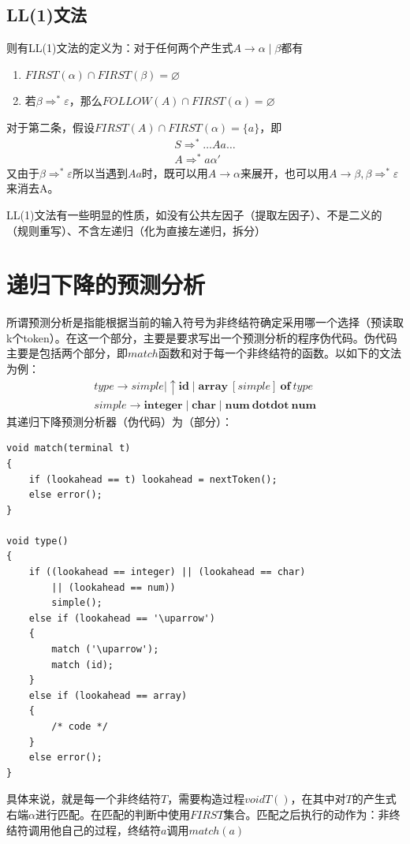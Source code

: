 \documentclass[]{report}
\begin{document}
		\subsection{LL(1)文法}
		则有LL(1)文法的定义为：对于任何两个产生式$A\to\alpha\mid\beta$都有
		\begin{enumerate}
			\item $FIRST(\alpha)\cap FIRST(\beta)=\varnothing$
			\item 若$\beta\Rightarrow^*\varepsilon$，那么$FOLLOW(A)\cap FIRST(\alpha)=\varnothing$
		\end{enumerate}
		对于第二条，假设$FIRST(A)\cap FIRST(\alpha)=\{a\}$，即
		\[\begin{gathered}
			S\Rightarrow^*\dots Aa\dots\\
			A\Rightarrow^*a\alpha'
		\end{gathered}\]
		又由于$\beta\Rightarrow^*\varepsilon$所以当遇到$Aa$时，既可以用$A\to\alpha$来展开，也可以用$A\to\beta,\beta\Rightarrow^*\varepsilon$来消去A。\par
		LL(1)文法有一些明显的性质，如没有公共左因子（提取左因子）、不是二义的（规则重写）、不含左递归（化为直接左递归，拆分）
	\section{递归下降的预测分析}\label{section:Recursive_Descent_Function}
	所谓预测分析是指能根据当前的输入符号为非终结符确定采用哪一个选择（预读取k个token）。在这一个部分，主要是要求写出一个预测分析的程序伪代码。伪代码主要是包括两个部分，即$match$函数和对于每一个非终结符的函数。以如下的文法为例：
	\[\begin{gathered}
		type\to simple\mid\uparrow\mathbf{id}\mid\mathbf{array}\ [simple]\ \mathbf{of}\ type\\
		simple\to\mathbf{integer}\mid\mathbf{char}\mid\mathbf{num\ dotdot\ num}
	\end{gathered}\]
	其递归下降预测分析器（伪代码）为（部分）：
	\begin{lstlisting}
void match(terminal t)
{
	if (lookahead == t) lookahead = nextToken();
	else error();
}

void type()
{
	if ((lookahead == integer) || (lookahead == char)
		|| (lookahead == num))
		simple();
	else if (lookahead == '\uparrow')
	{
		match ('\uparrow');
		match (id);
	}
	else if (lookahead == array)
	{
		/* code */
	}
	else error();
}
	\end{lstlisting}
	具体来说，就是每一个非终结符$T$，需要构造过程$void T()$，在其中对$T$的产生式右端$\alpha$进行匹配。在匹配的判断中使用$FIRST$集合。匹配之后执行的动作为：非终结符调用他自己的过程，终结符$a$调用$match(a)$
\end{document}
